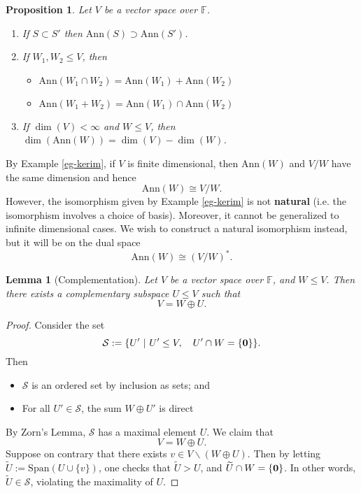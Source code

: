 \documentclass[11pt,openany]{book}
\theoremstyle{plain}
\newtheorem{lemma}[lemma]{Lemma}
\newtheorem{proposition}[proposition]{Proposition}
\theoremstyle{definition}
\theoremstyle{remark}
\begin{document}
\begin{proposition}
Let $V$ be a vector space over $\mathbb{F}$.
    \begin{enumerate}
        \item If $S \subset S'$ then $\mathrm{Ann}(S) \supset \mathrm{Ann}(S')$.
        \item If $W_1, W_2 \leq V$, then 
        \begin{itemize}
            \item $\mathrm{Ann}(W_1 \cap W_2) = \mathrm{Ann}(W_1) + \mathrm{Ann}(W_2)$
            \item $\mathrm{Ann}(W_1 + W_2) = \mathrm{Ann}(W_1) \cap \mathrm{Ann}(W_2)$
        \end{itemize}
        \item If $\dim(V) < \infty$ and $W \leq V$, then $\dim(\mathrm{Ann}(W)) = \dim(V) - \dim(W)$.
    \end{enumerate}
\end{proposition}
By Example \ref{eg-kerim}, if $V$ is finite dimensional, then $\mathrm{Ann}(W)$ and $V/W$ have the same dimension and hence 
$$\mathrm{Ann}(W) \cong V/W.$$
However, the isomorphism given by Example \ref{eg-kerim} is not {\bf natural} (i.e. the isomorphism involves a choice of basis). Moreover, it cannot be generalized to infinite dimensional cases. We wish to construct a natural isomorphism instead, but it will be on the dual space
$$\mathrm{Ann}(W) \cong (V/W)^*.$$

\begin{lemma}[Complementation]
    Let $V$ be a vector space over $\mathbb{F}$, and $W \leq V$. Then there exists a complementary subspace $U \leq V$ such that 
    $$V = W \oplus U.$$
\end{lemma}
\begin{proof}
    Consider the set
    $$\mathcal{S} := \{U'\ |\ U' \leq V, \quad U' \cap W = \{\bf 0\}\}.$$
    Then 
    \begin{itemize}
    \item $\mathcal{S}$ is an ordered set by inclusion as sets; and 
    \item For all $U' \in \mathcal{S}$, the sum $W \oplus U'$ is direct
    \end{itemize}
    By Zorn's Lemma, $\mathcal{S}$ has a maximal element $U$. We claim that 
    $$V = W \oplus U.$$
    Suppose on contrary that there exists $v \in V \backslash (W \oplus U)$. Then by letting $\widetilde{U} := \mathrm{Span}(U \cup \{v\})$, one checks that $\widetilde{U} > U$, and $\widetilde{U} \cap W = \{\bf 0\}$. 
    In other words, $\widetilde{U} \in \mathcal{S}$, violating the maximality of $U$.    
\end{proof}
\end{document}
